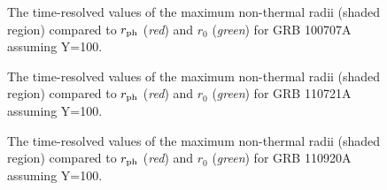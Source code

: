 \begin{figure}[tp]
  \centering
  \caption{The time-resolved values of the maximum non-thermal radii (shaded region) compared to $r_{\rm ph}$ (\emph{red}) and $r_{0}$ (\emph{green}) for GRB 100707A assuming Y=100.}
  \label{fig:RNT3}
\end{figure}


\begin{figure}[tp]
  \centering
  \caption{The time-resolved values of the maximum non-thermal radii (shaded region) compared to $r_{\rm ph}$ (\emph{red}) and $r_{0}$ (\emph{green}) for GRB 110721A assuming Y=100.}
  \label{fig:RNT4}
\end{figure}


\begin{figure}[tp]
  \centering
  \caption{The time-resolved values of the maximum non-thermal radii (shaded region) compared to $r_{\rm ph}$ (\emph{red}) and $r_{0}$ (\emph{green}) for GRB 110920A assuming Y=100.}
  \label{fig:RNT5}
\end{figure}





